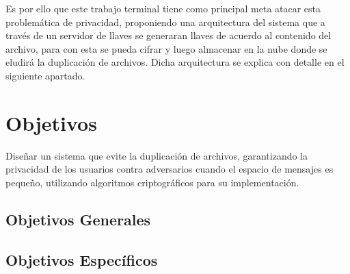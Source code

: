 Es por ello que este trabajo terminal tiene como principal meta atacar esta problemática de privacidad, proponiendo una arquitectura del sistema que a través de un servidor de llaves se generaran llaves de acuerdo al contenido del archivo, para con esta se pueda cifrar y luego almacenar en la nube donde se eludirá la duplicación de archivos. Dicha arquitectura se explica con detalle en el siguiente apartado.

\section{Objetivos} %

Diseñar un sistema que evite la duplicación de archivos, garantizando la privacidad de los usuarios contra adversarios cuando el espacio de mensajes es pequeño, utilizando algoritmos criptográficos para su implementación.

    \subsection{Objetivos Generales} %
    
    
     
    \subsection{Objetivos Específicos} %
    
    
                
